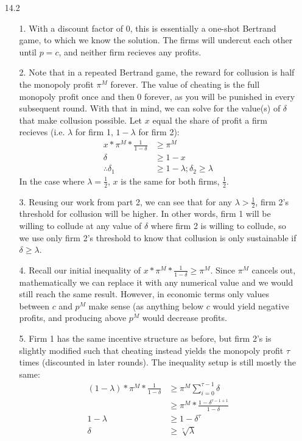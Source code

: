 \documentclass[12pt,letterpaper]{article}
\begin{document}
\begin{enumerate}
\item[14.2]
\begin{enumerate}
	\item[1.] With a discount factor of 0, this is essentially a one-shot Bertrand game, to which we know the solution. The firms will undercut each other until $p = c$, and neither firm recieves any profits.
	\item[2.] Note that in a repeated Bertrand game, the reward for collusion is half the monopoly profit $\pi^M$ forever. The value of cheating is the full monopoly profit once and then 0 forever, as you will be punished in every subsequent round. With that in mind, we can solve for the value(s) of $\delta$ that make collusion possible. Let $x$ equal the share of profit a firm recieves (i.e. $\lambda$ for firm 1, $1 - \lambda$ for firm 2):
	\begin{align*}
		x * \pi^M * \frac{1}{1-\delta} &\geq \pi^M \\
		\delta &\geq 1 - x \\
		\therefore \delta_1 &\geq 1 - \lambda; \delta_2 \geq \lambda
	\end{align*}  
	In the case where $\lambda = \frac{1}{2}$, $x$ is the same for both firms, $\frac{1}{2}$.

	\item[3.] Reusing our work from part 2, we can see that for any $\lambda > \frac{1}{2}$, firm 2's threshold for collusion will be higher. In other words, firm 1 will be willing to collude at any value of $\delta$ where firm 2 is willing to collude, so we use only firm 2's threshold to know that collusion is only sustainable if $\delta \geq \lambda$. 
	\item[4.] Recall our initial inequality of $x * \pi^M * \frac{1}{1-\delta} \geq \pi^M$. Since $\pi^M$ cancels out, mathematically we can replace it with any numerical value and we would still reach the same result. However, in economic terms only values between $c$ and $p^M$ make sense (as anything below $c$ would yield negative profits, and producing above $p^M$ would decrease profits.
	\item[5.] Firm 1 has the same incentive structure as before, but firm 2's is slightly modified such that  cheating instead yields the monopoly profit $\tau$ times (discounted in later rounds). The inequality setup is still mostly the same:
	\begin{align*}
		(1-\lambda) * \pi^M * \frac{1}{1-\delta} &\geq \pi^M \sum_{i=0}^{\tau-1} \delta \\
		&\geq \pi^M * \frac{1 - \delta^{\tau-1+1}}{1-\delta} \\
		1-\lambda &\geq 1 - \delta^\tau \\
		\delta &\geq \sqrt[\tau]{\lambda}
	\end{align*}   
\end{enumerate} 


\end{enumerate}
	
\end{document}
